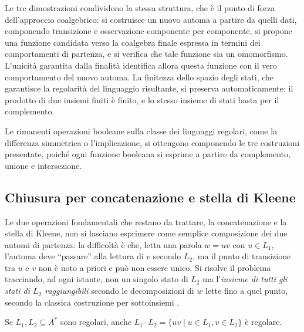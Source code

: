 Le tre dimostrazioni condividono la stessa struttura, che è il punto di forza dell'approccio coalgebrico: si costruisce un nuovo automa a partire da quelli dati, componendo transizione e osservazione componente per componente, si propone una funzione candidata verso la coalgebra finale espressa in termini dei comportamenti di partenza, e si verifica che tale funzione sia un omomorfismo. L'unicità garantita dalla finalità identifica allora questa funzione con il vero comportamento del nuovo automa. La finitezza dello spazio degli stati, che garantisce la regolarità del linguaggio risultante, si preserva automaticamente: il prodotto di due insiemi finiti è finito, e lo stesso insieme di stati basta per il complemento.

Le rimanenti operazioni booleane sulla classe dei linguaggi regolari, come la differenza simmetrica o l'implicazione, si ottengono componendo le tre costruzioni presentate, poiché ogni funzione booleana si esprime a partire da complemento, unione e intersezione.

\subsection{Chiusura per concatenazione e stella di Kleene}

Le due operazioni fondamentali che restano da trattare, la concatenazione e la stella di Kleene, non si lasciano esprimere come semplice composizione dei due automi di partenza: la difficoltà è che, letta una parola \(w = uv\) con \(u \in L_1\), l'automa deve ``passare'' alla lettura di \(v\) secondo \(L_2\), ma il punto di transizione tra \(u\) e \(v\) non è noto a priori e può non essere unico. Si risolve il problema tracciando, ad ogni istante, non un singolo stato di \(L_2\) ma l'\textit{insieme di tutti gli stati di \(L_2\) raggiungibili} secondo le decomposizioni di \(w\) lette fino a quel punto, secondo la classica costruzione per sottoinsiemi \cite{hopcroft2006}.

\begin{proposition}
  Se \(L_1, L_2 \subseteq A^*\) sono regolari, anche \(L_1 \cdot L_2 = \{uv \mid u \in L_1, v \in L_2\}\) è regolare.
\end{proposition}

